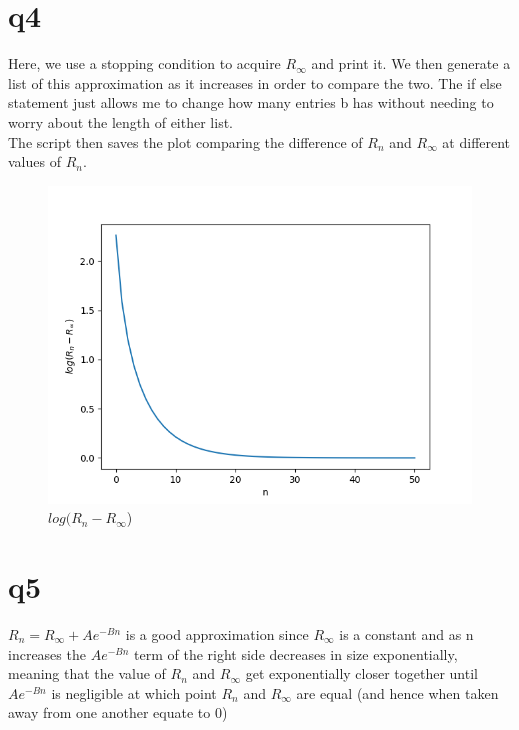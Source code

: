 \documentclass[a4paper,english]{article}
\begin{document}
    \section{q4}
        
        Here, we use a stopping condition to acquire $R_\infty$ and print it. We then generate a list of this approximation as it increases in 
        order to compare the two. The if else statement just allows me to change how many entries b has without needing to worry about the length
        of either list. 
        \\ The script then saves the plot comparing the difference of $R_n$ and $R_\infty$ at different values of $R_n$.
        \begin{figure}
            \caption{$log(R_n - R_\infty$)}
            \includegraphics[scale=0.7]{./q2_4.png}
        \end{figure}

    \section{q5}
        $R_n = R_\infty + Ae^{-Bn}$ is a good approximation
        since $R_\infty$ is a constant and as n increases the $Ae^{-Bn}$ term of the right side decreases in size exponentially, meaning 
        that the value of $R_n$ and $R_\infty$ get exponentially closer together until $Ae^{-Bn}$ is negligible at which point $R_n$ and 
        $R_\infty$ are equal (and hence when taken away from one another equate to 0)
\end{document}
